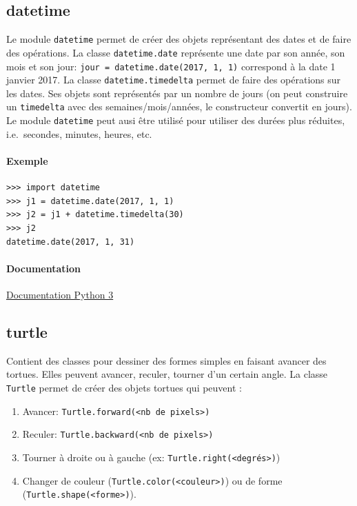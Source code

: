 \documentclass[a4paper, french, 10pt]{article}
\newcommand{\code}[1]{{\small\texttt{#1}}}
\begin{document}
\subsection{datetime}

Le module \code{datetime}\marginpar{\code{datetime}} permet de créer des objets représentant des dates et de faire des opérations. La classe \code{datetime.date} représente une date par son année, son mois et son jour: \code{jour = datetime.date(2017, 1, 1)} correspond à la date 1\ier{} janvier 2017.
La classe \code{datetime.timedelta} permet de faire des opérations sur les dates. Ses objets sont représentés par un nombre de jours (on peut construire un \code{timedelta} avec des semaines/mois/années, le constructeur convertit en jours).
Le module \code{datetime} peut ausi être utilisé pour utiliser des durées plus réduites, i.e.\ secondes, minutes, heures, etc.

\paragraph{Exemple}
\begin{Verbatim}[fontsize = \footnotesize, frame = single]
>>> import datetime
>>> j1 = datetime.date(2017, 1, 1)
>>> j2 = j1 + datetime.timedelta(30)
>>> j2
datetime.date(2017, 1, 31)
\end{Verbatim}


\paragraph*{Documentation} \href{https://docs.python.org/fr/3/library/datetime.html}{Documentation Python 3}

\subsection{turtle}

Contient des classes pour dessiner des formes simples en faisant avancer des tortues. Elles peuvent avancer, reculer, tourner d'un certain angle.
La classe \code{Turtle} permet de créer des objets tortues qui peuvent :
\begin{enumerate}
        \item Avancer: \code{Turtle.forward(<nb de pixels>)}
        \item Reculer: \code{Turtle.backward(<nb de pixels>)}
        \item Tourner à droite ou à gauche (ex: \code{Turtle.right(<degrés>)})
        \item Changer de couleur (\code{Turtle.color(<couleur>)}) ou de forme (\code{Turtle.shape(<forme>)}).
\end{enumerate}
\end{document}
